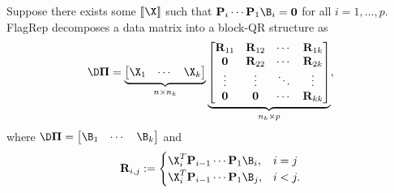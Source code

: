 \begin{prop}
    Suppose there exists some $[\![ \X ]\!]$ such that $\mathbf{P}_i \cdots \mathbf{P}_1 \B_i = \mathbf{0}$ for all $i=1,\dots,p$. FlagRep decomposes a data matrix into a block-QR structure as
    \begin{equation}
        \D \boldsymbol{\Pi}
        = \underbrace{\begin{bmatrix} \X_1 & \cdots & \X_k \end{bmatrix}}_{n \times n_k}
        \underbrace{\begin{bmatrix}
            \mathbf{R}_{11} & \mathbf{R}_{12} & \cdots & \mathbf{R}_{1k}\\
            \mathbf{0} & \mathbf{R}_{22} & \cdots & \mathbf{R}_{2k}\\
            \vdots & \vdots & \ddots & \vdots\\
            \mathbf{0} & \mathbf{0} & \cdots & \mathbf{R}_{kk}
        \end{bmatrix}}_{n_k \times p},
    \end{equation}
    where $\D \boldsymbol{\Pi} = \begin{bmatrix} \B_1 & \cdots & \B_k \end{bmatrix}$ and
    \begin{equation}
        \mathbf{R}_{i,j} := 
        \begin{cases}
            \X_i^T\mathbf{P}_{i-1}\cdots \mathbf{P}_1 \B_i, &i=j\\
            \X_i^T\mathbf{P}_{i-1}\cdots \mathbf{P}_1 \B_j, &i < j.
        \end{cases}
    \end{equation}
\end{prop}
